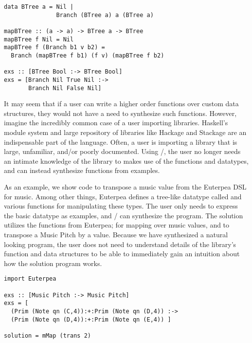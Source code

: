 \begin{lstlisting}
data BTree a = Nil |
               Branch (BTree a) a (BTree a)

mapBTree :: (a -> a) -> BTree a -> BTree 
mapBTree f Nil = Nil
mapBTree f (Branch b1 v b2) = 
  Branch (mapBTree f b1) (f v) (mapBTree f b2)

exs :: [BTree Bool :-> BTree Bool]
exs = [Branch Nil True Nil :->
       Branch Nil False Nil]
\end{lstlisting}

It may seem that if a user can write a higher order functions over custom data structures, they would not have a need to synthesize such functions.
However, imagine the incredibly common case of a user importing libraries.
Haskell's module system and large repository of libraries like Hackage and Stackage are an indispensable part of the language\cite{hackage,stackage}.
Often, a user is importing a library that is large, unfamiliar, and/or poorly documented.
Using \ourTool/, the user no longer needs an intimate knowledge of the library to makes use of the functions and datatypes, and can instead synthesize functions from examples.

As an example, we show code to transpose a music value from the Euterpea DSL for music\cite{euterpea}.
Among other things, Euterpea defines a tree-like datatype called  and various functions for manipulating these types.
The user only needs to express the basic datatype as examples, and \ourTool/ can synthesize the  program.
The solution utilizes the functions from Euterpea;  for mapping over music values, and  to transpose a Music Pitch by a value.
Because we have synthesized a natural looking program, the user does not need to understand details of the library's function and data structures to be able to immediately gain an intuition about how the solution program works.

\begin{lstlisting}
import Euterpea

exs :: [Music Pitch :-> Music Pitch]
exs = [
  (Prim (Note qn (C,4)):+:Prim (Note qn (D,4)) :->
  (Prim (Note qn (D,4)):+:Prim (Note qn (E,4)) ]
        
solution = mMap (trans 2)
\end{lstlisting}

